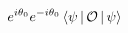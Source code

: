 \documentclass[preview]{standalone}
\begin{document}
\begin{align*}
e^{i \theta_0}e^{-i \theta_0}\Braket{\psi  |\mathcal{O}|\psi }
\end{align*}
\end{document}
